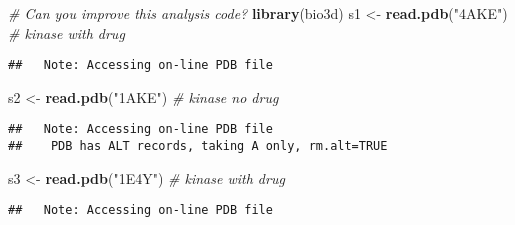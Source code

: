 \documentclass[]{article}
\newenvironment{Shaded}{\begin{snugshade}}{\end{snugshade}}
\newcommand{\KeywordTok}[1]{\textcolor[rgb]{0.13,0.29,0.53}{\textbf{#1}}}
\newcommand{\DataTypeTok}[1]{\textcolor[rgb]{0.13,0.29,0.53}{#1}}
\newcommand{\StringTok}[1]{\textcolor[rgb]{0.31,0.60,0.02}{#1}}
\newcommand{\CommentTok}[1]{\textcolor[rgb]{0.56,0.35,0.01}{\textit{#1}}}
\newcommand{\OperatorTok}[1]{\textcolor[rgb]{0.81,0.36,0.00}{\textbf{#1}}}
\newcommand{\NormalTok}[1]{#1}
\begin{document}
\begin{Shaded}
\begin{Highlighting}[]
\CommentTok{# Can you improve this analysis code?}
\KeywordTok{library}\NormalTok{(bio3d)}
\NormalTok{s1 <-}\StringTok{ }\KeywordTok{read.pdb}\NormalTok{(}\StringTok{"4AKE"}\NormalTok{) }\CommentTok{# kinase with drug}
\end{Highlighting}
\end{Shaded}

\begin{verbatim}
##   Note: Accessing on-line PDB file
\end{verbatim}

\begin{Shaded}
\begin{Highlighting}[]
\NormalTok{s2 <-}\StringTok{ }\KeywordTok{read.pdb}\NormalTok{(}\StringTok{"1AKE"}\NormalTok{) }\CommentTok{# kinase no drug}
\end{Highlighting}
\end{Shaded}

\begin{verbatim}
##   Note: Accessing on-line PDB file
##    PDB has ALT records, taking A only, rm.alt=TRUE
\end{verbatim}

\begin{Shaded}
\begin{Highlighting}[]
\NormalTok{s3 <-}\StringTok{ }\KeywordTok{read.pdb}\NormalTok{(}\StringTok{"1E4Y"}\NormalTok{) }\CommentTok{# kinase with drug}
\end{Highlighting}
\end{Shaded}

\begin{verbatim}
##   Note: Accessing on-line PDB file
\end{verbatim}

\begin{Shaded}
\end{Shaded}
\end{document}
